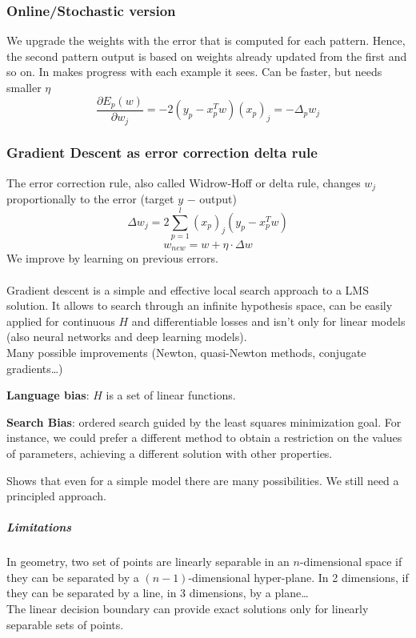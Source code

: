 \documentclass[10pt]{report}
\begin{document}
\subsubsection{Online/Stochastic version} We upgrade the weights with the error that is computed for each pattern. Hence, the second pattern output is based on weights already updated from the first and so on. In makes progress with each example it sees. Can be faster, but needs smaller $\eta$
$$\frac{\partial E_p(w)}{\partial w_j} = -2(y_p - x_p^T w)(x_p)_j = -\Delta_p w_j$$
\subsubsection{Gradient Descent as error correction delta rule} The error correction rule, also called Widrow-Hoff or delta rule, changes $w_j$ proportionally to the error (target $y$ $-$ output)
$$\Delta w_j = 2 \sum_{p=1}^l (x_p)_j (y_p - x_p^T w)$$
$$w_{new} = w + \eta\cdot\Delta w$$
We improve by learning on previous errors.\\\\
Gradient descent is a simple and effective local search approach to a LMS solution. It allows to search through an infinite hypothesis space, can be easily applied for continuous $H$ and differentiable losses and isn't only for linear models (also neural networks and deep learning models).\\
Many possible improvements (Newton, quasi-Newton methods, conjugate gradients\ldots)
\pagebreak
\begin{list}{}{}
	\item \textbf{Language bias}: $H$ is a set of linear functions.
	\item \textbf{Search Bias}: ordered search guided by the least squares minimization goal. For instance, we could prefer a different method to obtain a restriction on the values of parameters, achieving a different solution with other properties.
\end{list}
Shows that even for a simple model there are many possibilities. We still need a principled approach.
\subparagraph{Limitations} In geometry, two set of points are linearly separable in an $n$-dimensional space if they can be separated by a $(n-1)$-dimensional hyper-plane. In 2 dimensions, if they can be separated by a line, in 3 dimensions, by a plane\ldots\\
The linear decision boundary can provide exact solutions only for linearly separable sets of points.
\end{document}
